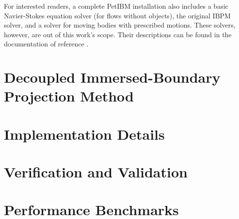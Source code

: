 For interested readers, a complete PetIBM installation also includes a basic Navier-Stokes equation solver (for flows without objects), the original IBPM solver, and a solver for moving bodies with prescribed motions.
These solvers, however, are out of this work's scope.
Their descriptions can be found in the documentation of reference \cite{chuang_petibm:_2018}.

\section{Decoupled Immersed-Boundary Projection Method}\label{sec:petibm-math}


\section{Implementation Details}\label{sec:petibm-impl}


\section{Verification and Validation}\label{sec:petibm-vv}


\section{Performance Benchmarks}\label{sec:petibm-perf}

